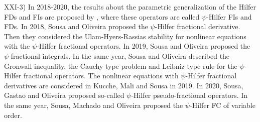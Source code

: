 \documentclass[12pt]{article}
\begin{document}


XXI-3) In 2018-2020, the results about the parametric generalization of the Hilfer FDs and FIs are proposed by 
\cite{Sousa-1,Sousa-2,Sousa-3,Sousa-4,Sousa-5,Sousa-6,Sousa-7,Sousa-8}, where these operators are called $\psi$-Hilfer FIs and FDs.
In 2018, Sousa and Oliveira \cite{Sousa-1} proposed the $\psi$-Hilfer fractional derivative. 
Then they considered \cite{Sousa-2} the Ulam-Hyers-Rassias stability for nonlinear equations with the $\psi$-Hilfer fractional operators. 
In 2019, Sousa and Oliveira \cite{Sousa-3} proposed the $\psi$-fractional integrals. 
In the same year, Sousa and Oliveira \cite{Sousa-4,Sousa-5} described 
the Gronwall inequality, the Cauchy type problem and Leibniz type rule for the $\psi$-Hilfer fractional operators. 
The nonlinear equations with $\psi$-Hilfer fractional derivatives are considered in Kucche, Mali and Sousa \cite{Sousa-6} in 2019.
In 2020, Sousa, Gastao and Oliveira proposed so-called $\psi$-Hilfer pseudo-fractional operators.
In the same year, Sousa, Machado and Oliveira \cite{Sousa-8} proposed the $\psi$-Hilfer FC of variable order. 


\end{document}

